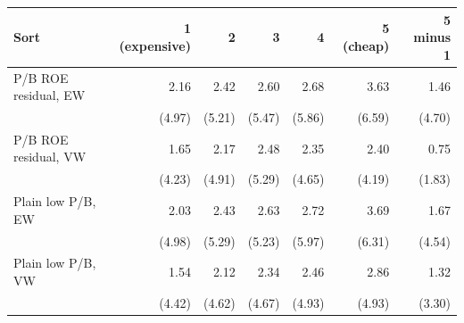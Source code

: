 \begin{tabular}{lrrrrrr}
\toprule
Sort & 1 (expensive) & 2 & 3 & 4 & 5 (cheap) & 5 minus 1 \\
\midrule
P/B ROE residual, EW & 2.16 & 2.42 & 2.60 & 2.68 & 3.63 & 1.46 \\
 & (4.97) & (5.21) & (5.47) & (5.86) & (6.59) & (4.70) \\
P/B ROE residual, VW & 1.65 & 2.17 & 2.48 & 2.35 & 2.40 & 0.75 \\
 & (4.23) & (4.91) & (5.29) & (4.65) & (4.19) & (1.83) \\
Plain low P/B, EW & 2.03 & 2.43 & 2.63 & 2.72 & 3.69 & 1.67 \\
 & (4.98) & (5.29) & (5.23) & (5.97) & (6.31) & (4.54) \\
Plain low P/B, VW & 1.54 & 2.12 & 2.34 & 2.46 & 2.86 & 1.32 \\
 & (4.42) & (4.62) & (4.67) & (4.93) & (4.93) & (3.30) \\
\bottomrule
\end{tabular}
